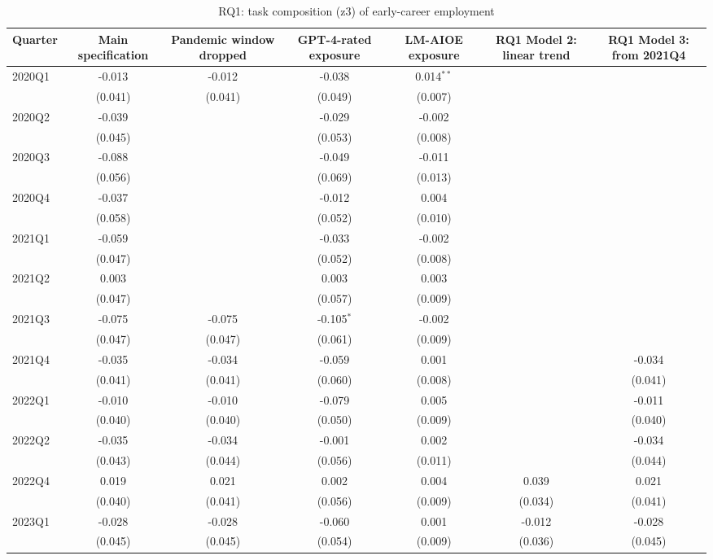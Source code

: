 \begin{table}[htbp]\centering
\caption{RQ1: task composition (z3) of early-career employment}
\begin{tabular}{lcccccc}
\toprule
Quarter & Main specification & Pandemic window dropped & GPT-4-rated exposure & LM-AIOE exposure & RQ1 Model 2: linear trend & RQ1 Model 3: from 2021Q4 \\
\midrule
2020Q1 & -0.013 & -0.012 & -0.038 & 0.014$^{**}$ &  &  \\
 & (0.041) & (0.041) & (0.049) & (0.007) &  &  \\
2020Q2 & -0.039 &  & -0.029 & -0.002 &  &  \\
 & (0.045) &  & (0.053) & (0.008) &  &  \\
2020Q3 & -0.088 &  & -0.049 & -0.011 &  &  \\
 & (0.056) &  & (0.069) & (0.013) &  &  \\
2020Q4 & -0.037 &  & -0.012 & 0.004 &  &  \\
 & (0.058) &  & (0.052) & (0.010) &  &  \\
2021Q1 & -0.059 &  & -0.033 & -0.002 &  &  \\
 & (0.047) &  & (0.052) & (0.008) &  &  \\
2021Q2 & 0.003 &  & 0.003 & 0.003 &  &  \\
 & (0.047) &  & (0.057) & (0.009) &  &  \\
2021Q3 & -0.075 & -0.075 & -0.105$^{*}$ & -0.002 &  &  \\
 & (0.047) & (0.047) & (0.061) & (0.009) &  &  \\
2021Q4 & -0.035 & -0.034 & -0.059 & 0.001 &  & -0.034 \\
 & (0.041) & (0.041) & (0.060) & (0.008) &  & (0.041) \\
2022Q1 & -0.010 & -0.010 & -0.079 & 0.005 &  & -0.011 \\
 & (0.040) & (0.040) & (0.050) & (0.009) &  & (0.040) \\
2022Q2 & -0.035 & -0.034 & -0.001 & 0.002 &  & -0.034 \\
 & (0.043) & (0.044) & (0.056) & (0.011) &  & (0.044) \\
2022Q4 & 0.019 & 0.021 & 0.002 & 0.004 & 0.039 & 0.021 \\
 & (0.040) & (0.041) & (0.056) & (0.009) & (0.034) & (0.041) \\
2023Q1 & -0.028 & -0.028 & -0.060 & 0.001 & -0.012 & -0.028 \\
 & (0.045) & (0.045) & (0.054) & (0.009) & (0.036) & (0.045) \\

\end{tabular}
\end{table}
